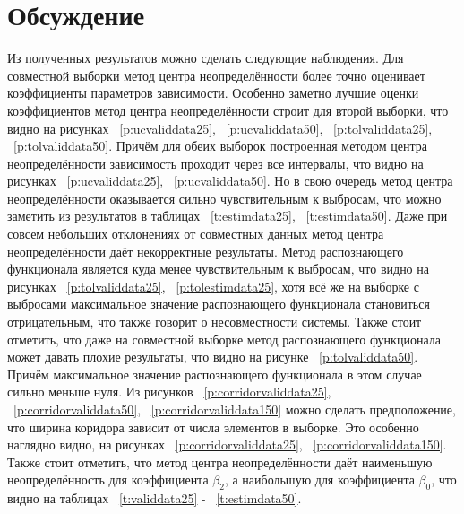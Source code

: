 \documentclass[a4paper,12pt]{article}
\begin{document}
    \section{Обсуждение}
    Из полученных результатов можно сделать следующие наблюдения.
    Для совместной выборки метод центра неопределённости более точно оценивает коэффициенты параметров зависимости.
    Особенно заметно лучшие оценки коэффициентов метод центра неопределённости строит для второй выборки, что видно на рисунках ~\ref{p:ucvaliddata25}, ~\ref{p:ucvaliddata50}, ~\ref{p:tolvaliddata25}, ~\ref{p:tolvaliddata50}.
    Причём для обеих выборок построенная методом центра неопределённости зависимость проходит через все интервалы, что видно на рисунках ~\ref{p:ucvaliddata25}, ~\ref{p:ucvaliddata50}.
    \newline
    Но в свою очередь метод центра неопределённости оказывается сильно чувствительным к выбросам, что можно заметить из результатов в таблицах ~\ref{t:estimdata25}, ~\ref{t:estimdata50}.
    Даже при совсем небольших отклонениях от совместных данных метод центра неопределённости даёт некорректные результаты.
    Метод распознающего функционала является куда менее чувствительным к выбросам, что видно на рисунках ~\ref{p:tolvaliddata25}, ~\ref{p:tolestimdata25},
    хотя всё же на выборке с выбросами максимальное значение распознающего функционала становиться отрицательным, что также говорит о несовместности системы.
    \newline
    Также стоит отметить, что даже на совместной выборке метод распознающего функционала может давать плохие результаты, что видно на рисунке ~\ref{p:tolvaliddata50}.
    Причём максимальное значение распознающего функционала в этом случае сильно меньше нуля.  
    \newline
    Из рисунков ~\ref{p:corridorvaliddata25}, ~\ref{p:corridorvaliddata50}, ~\ref{p:corridorvaliddata150} можно сделать предположение, что ширина коридора зависит от числа элементов в выборке.
    Это особенно наглядно видно, на рисунках ~\ref{p:corridorvaliddata25}, ~\ref{p:corridorvaliddata150}.
    \newline
    Также стоит отметить, что метод центра неопределённости даёт наименьшую неопределённость для коэффициента $ \beta_{2} $, а наибольшую для коэффициента $ \beta_{0} $, что видно на таблицах ~\ref{t:validdata25} - ~\ref{t:estimdata50}.
\end{document}
